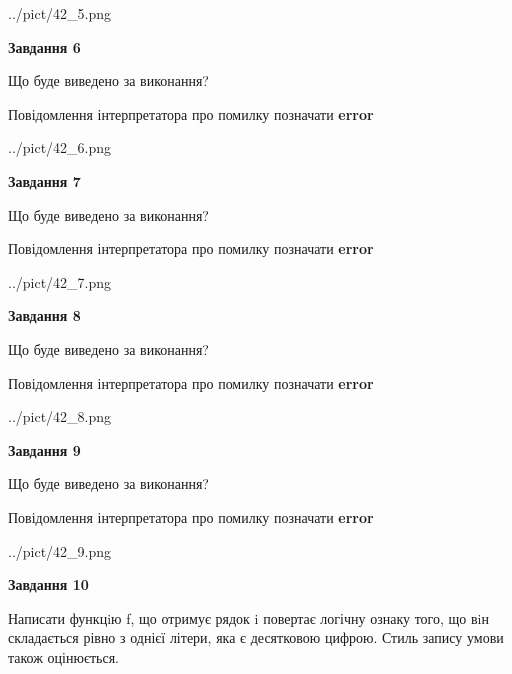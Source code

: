 \documentclass[12pt, ukrainian]{article}
\begin{document}
{\begin {large}
\begin{center}
	{../pict/42_5.png}
\end{center}
\newpage

{\begin {center}\textbf{Завдання 6}\end {center}}\par
Що буде виведено за виконання? \par
Повідомлення інтерпретатора про помилку позначати \textbf{error}

\begin{center}
	{../pict/42_6.png}
\end{center}
\newpage

{\begin {center}\textbf{Завдання 7}\end {center}}\par
Що буде виведено за виконання? \par
Повідомлення інтерпретатора про помилку позначати \textbf{error}

\begin{center}
	{../pict/42_7.png}
\end{center}
\newpage

{\begin {center}\textbf{Завдання 8}\end {center}}\par
Що буде виведено за виконання? \par
Повідомлення інтерпретатора про помилку позначати \textbf{error}

\begin{center}
	{../pict/42_8.png}
\end{center}
\newpage

{\begin {center}\textbf{Завдання 9}\end {center}}\par
Що буде виведено за виконання? \par
Повідомлення інтерпретатора про помилку позначати \textbf{error}

\begin{center}
	{../pict/42_9.png}
\end{center}
\newpage

{\begin {center}\textbf{Завдання 10}\end {center}}\par

Написати функцiю f, що отримує рядок i повертає логічну ознаку того, що вiн складається рівно з однієї літери, яка є десятковою цифрою. Стиль запису умови також оцінюється.\par
\newpage

\end {large}}
\end{document}
